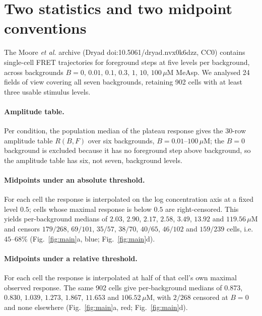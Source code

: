 ﻿\documentclass[11pt,a4paper]{article}
\begin{document}
\section{Two statistics and two midpoint conventions}
\label{sec:statistics}

The Moore \emph{et al.} archive \cite{Moore2024} (Dryad doi:10.5061/dryad.nvx0k6dzz, CC0) contains
single-cell FRET trajectories for foreground steps at five levels per background, across
backgrounds $B=0,\,0.01,\,0.1,\,0.3,\,1,\,10,\,100\,\mu$M MeAsp. We analysed 24 fields of view
covering all seven backgrounds, retaining 902 cells with at least three usable stimulus levels.

\paragraph{Amplitude table.} Per condition, the population median of the plateau response gives the
30-row amplitude table $R(B,F)$ over six backgrounds, $B=0.01$--$100\,\mu$M; the $B=0$ background is
excluded because it has no foreground step above background, so the amplitude table has six, not
seven, background levels.

\paragraph{Midpoints under an absolute threshold.} For each cell the response is interpolated on the
log concentration axis at a fixed level $0.5$; cells whose maximal response is below $0.5$ are
right-censored. This yields per-background medians of $2.03$, $2.90$, $2.17$, $2.58$, $3.49$,
$13.92$ and $119.56\,\mu$M and censors $179/268$, $69/101$, $35/57$, $38/70$, $40/65$, $46/102$ and
$159/239$ cells, i.e.\ $45$--$68\%$ (Fig.~\ref{fig:main}a, blue; Fig.~\ref{fig:main}d).

\paragraph{Midpoints under a relative threshold.} For each cell the response is interpolated at half
of that cell's own maximal observed response. The same 902 cells give per-background medians of
$0.873$, $0.830$, $1.039$, $1.273$, $1.867$, $11.653$ and $106.52\,\mu$M, with $2/268$ censored at
$B=0$ and none elsewhere (Fig.~\ref{fig:main}a, red; Fig.~\ref{fig:main}d).
\end{document}
